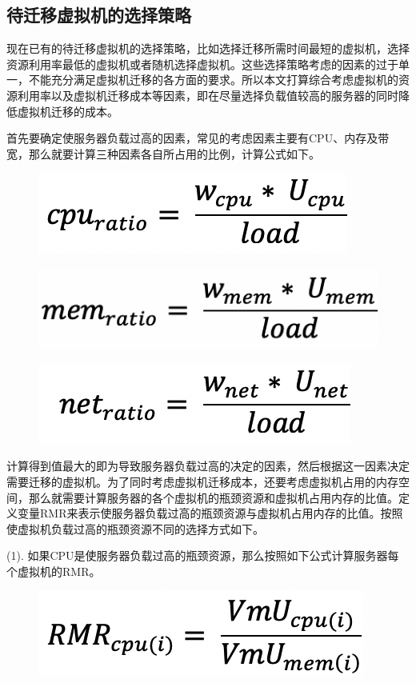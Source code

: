 \subsection{待迁移虚拟机的选择策略}
现在已有的待迁移虚拟机的选择策略，比如选择迁移所需时间最短的虚拟机，选择资源利用率最低的虚拟机或者随机选择虚拟机。这些选择策略考虑的因素的过于单一，不能充分满足虚拟机迁移的各方面的要求。所以本文打算综合考虑虚拟机的资源利用率以及虚拟机迁移成本等因素，即在尽量选择负载值较高的服务器的同时降低虚拟机迁移的成本。

首先要确定使服务器负载过高的因素，常见的考虑因素主要有CPU、内存及带宽，那么就要计算三种因素各自所占用的比例，计算公式如下。

 \begin{figure}[htb]
  \centering
  \includegraphics[width=0.3\linewidth]{./Figure/IMG_Chap3_9.png}
\end{figure}

 \begin{figure}[htb]
  \centering
  \includegraphics[width=0.3\linewidth]{./Figure/IMG_Chap3_10.png}
\end{figure}

 \begin{figure}[htb]
  \centering
  \includegraphics[width=0.3\linewidth]{./Figure/IMG_Chap3_11.png}
\end{figure}

计算得到值最大的即为导致服务器负载过高的决定的因素，然后根据这一因素决定需要迁移的虚拟机。为了同时考虑虚拟机迁移成本，还要考虑虚拟机占用的内存空间，那么就需要计算服务器的各个虚拟机的瓶颈资源和虚拟机占用内存的比值。定义变量RMR来表示使服务器负载过高的瓶颈资源与虚拟机占用内存的比值。按照使虚拟机负载过高的瓶颈资源不同的选择方式如下。

    (1). 如果CPU是使服务器负载过高的瓶颈资源，那么按照如下公式计算服务器每个虚拟机的RMR。

     \begin{figure}[htb]
      \centering
      \includegraphics[width=0.3\linewidth]{./Figure/IMG_Chap3_12.png}
     \end{figure}

